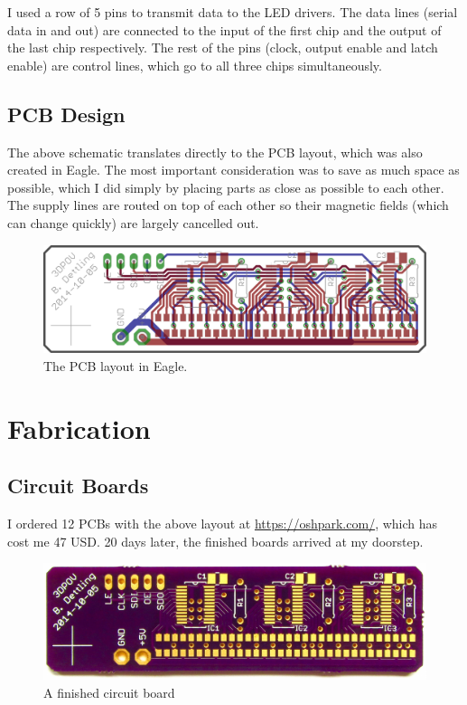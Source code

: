 \documentclass[a4paper, 11pt, titlepage]{article}
\begin{document}
I used a row of 5 pins to transmit data to the LED drivers. The data lines (serial data in
and out) are connected to the input of the first chip and the output of the last chip
respectively. The rest of the pins (clock, output enable and latch enable) are control lines,
which go to all three chips simultaneously.

\subsection{PCB Design}

The above schematic translates directly to the PCB layout, which was also created in Eagle. The
most important consideration was to save as much space as possible, which I did simply by placing
parts as close as possible to each other. The supply lines are routed on top of each other so
their magnetic fields (which can change quickly) are largely cancelled out.

\begin{figure}[h]
\vspace{4mm}
\includegraphics[width=\textwidth]{./images/board-layout.png}
\vspace{-8mm}
\caption{The PCB layout in Eagle.}
\vspace{-5mm}
\end{figure}


\section{Fabrication}

\subsection{Circuit Boards}

I ordered 12 PCBs with the above layout at \url{https://oshpark.com/}, which has cost me 47 USD.
20 days later, the finished boards arrived at my doorstep.

\begin{figure}[h]
\vspace{3mm}
\includegraphics[width=\textwidth]{./images/board-finished.jpeg}
\vspace{-10mm}
\caption{A finished circuit board}
\vspace{2mm}
\end{figure}
\end{document}
